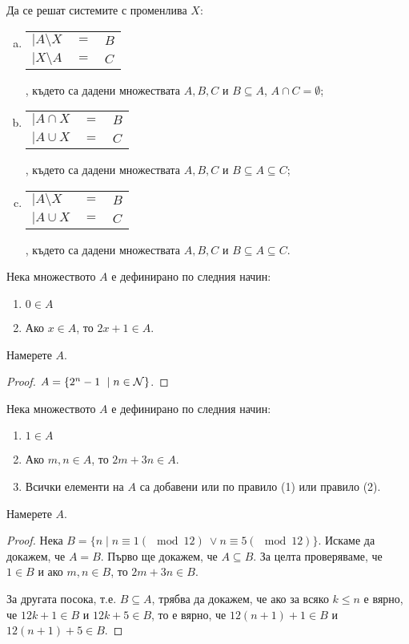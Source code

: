 \begin{problem}
  Да се решат системите с променлива $X$:
  \begin{enumerate}[(a)]
  \item
    \begin{tabular}{l c l}
      $\big|A\setminus X$ & $= $ & $ B$\\
      $\big|X\setminus A $ & $=$ & $ C$
    \end{tabular}, където са дадени множествата $A,B,C$ и $B\subseteq A$, $A\cap C = \emptyset$;
  \item
    \begin{tabular}{l c l}
      $\big|A\cap X$ & $= $ & $ B$\\
      $\big|A\cup X $ & $=$ & $ C$
    \end{tabular}, където са дадени множествата $A,B,C$ и $B\subseteq A\subseteq C$;
  \item
    \begin{tabular}{l c l}
      $\big|A\setminus X$ & $= $ & $ B$\\
      $\big|A\cup X $ & $=$ & $ C$
    \end{tabular}, където са дадени множествата $A,B,C$ и $B\subseteq A\subseteq C$.
  \end{enumerate}
\end{problem}



\begin{problem}
  Нека множеството $A$ е дефинирано по следния начин:
  \begin{enumerate}
  \item
    $0\in A$
  \item
    Ако $x\in A$, то $2x+1 \in A$.
\end{enumerate}
Намерете $A$.
\end{problem}
\begin{proof}
  $A = \{2^n - 1\ \mid n\in\mathcal{N}\}$.
\end{proof}

\begin{thm}
  Нека множеството $A$ е дефинирано по следния начин:
  \begin{enumerate}[(1)]
  \item
    $1\in A$
  \item
    Ако $m,n\in A$, то $2m+3n \in A$.
  \item
    Всички елементи на $A$ са добавени или по правило (1) или правило (2).
\end{enumerate}
Намерете $A$.
\end{thm}
\begin{proof}
  Нека $B = \{n \mid n\equiv 1 (\mod 12)\ \vee n\equiv 5 (\mod 12) \}$.
  Искаме да докажем, че $A = B$.
  Първо ще докажем, че $A\subseteq B$.
  За целта проверяваме, че $1\in B$ и ако $m,n \in B$, то $2m+3n \in B$.
  
  За другата посока, т.е. $B\subseteq A$, трябва да докажем, че ако
  за всяко $k\leq n$ е вярно, че $12k+1 \in B$ и $12k + 5 \in B$,
  то е вярно, че $12(n+1)+1 \in B $ и $12(n+1) + 5 \in B$.
\end{proof}



